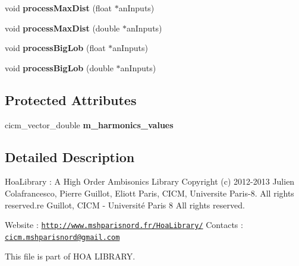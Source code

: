 \begin{DoxyCompactItemize}
\item 
\hypertarget{class_ambisonic_viewer_a3f73a0d2b78598d1f0f903041e6dc2f7}{void {\bfseries process\-Max\-Dist} (float $\ast$an\-Inputs)}\label{class_ambisonic_viewer_a3f73a0d2b78598d1f0f903041e6dc2f7}

\item 
\hypertarget{class_ambisonic_viewer_a513aa483fba06f420e6a812c7ed5d08c}{void {\bfseries process\-Max\-Dist} (double $\ast$an\-Inputs)}\label{class_ambisonic_viewer_a513aa483fba06f420e6a812c7ed5d08c}

\item 
\hypertarget{class_ambisonic_viewer_accd99213ad009b3ac7112f0ce8728e79}{void {\bfseries process\-Big\-Lob} (float $\ast$an\-Inputs)}\label{class_ambisonic_viewer_accd99213ad009b3ac7112f0ce8728e79}

\item 
\hypertarget{class_ambisonic_viewer_a10e3254f0e5188f6514e745a1e78f08d}{void {\bfseries process\-Big\-Lob} (double $\ast$an\-Inputs)}\label{class_ambisonic_viewer_a10e3254f0e5188f6514e745a1e78f08d}

\end{DoxyCompactItemize}
\subsection*{Protected Attributes}
\begin{DoxyCompactItemize}
\item 
\hypertarget{class_ambisonic_viewer_ad257853a6494a73560f6c00d15bc4f26}{cicm\-\_\-vector\-\_\-double {\bfseries m\-\_\-harmonics\-\_\-values}}\label{class_ambisonic_viewer_ad257853a6494a73560f6c00d15bc4f26}

\end{DoxyCompactItemize}


\subsection{Detailed Description}
Hoa\-Library \-: A High Order Ambisonics Library Copyright (c) 2012-\/2013 Julien Colafrancesco, Pierre Guillot, Eliott Paris, C\-I\-C\-M, Universite Paris-\/8. All rights reserved.\-re Guillot, C\-I\-C\-M -\/ Université Paris 8 All rights reserved.

Website \-: \href{http://www.mshparisnord.fr/HoaLibrary/}{\tt http\-://www.\-mshparisnord.\-fr/\-Hoa\-Library/} Contacts \-: \href{mailto:cicm.mshparisnord@gmail.com}{\tt cicm.\-mshparisnord@gmail.\-com}

This file is part of H\-O\-A L\-I\-B\-R\-A\-R\-Y.


